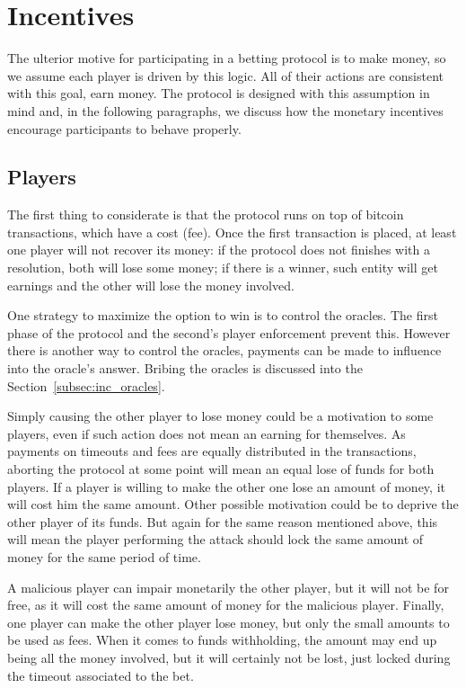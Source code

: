 \section{Incentives}

The ulterior motive for participating in a betting protocol is to make money, so
  we assume each player is driven by this logic.
All of their actions are consistent with this goal, earn money.
The protocol is designed with this assumption in mind and, in the following
  paragraphs, we discuss how the monetary incentives encourage participants to
  behave properly.

\subsection{Players}

The first thing to considerate is that the protocol runs on top of bitcoin
  transactions, which have a cost (fee).
Once the first transaction is placed, at least one player will not recover its
  money: if the protocol does not finishes with a resolution, both will lose
  some money; if there is a winner, such entity will get earnings and the other
  will lose the money involved.

One strategy to maximize the option to win is to control the oracles.
The first phase of the protocol and the second's player enforcement
  prevent this.
However there is another way to control the oracles, payments can be made to
  influence into the oracle's answer.
Bribing the oracles is discussed into the Section~\ref{subsec:inc_oracles}.

Simply causing the other player to lose money could be a motivation to some
  players, even if such action does not mean an earning for themselves.
As payments on timeouts and fees are equally distributed in the transactions,
  aborting the protocol at some point will mean an equal lose of funds for both
  players. If a player is willing to make the other one lose an amount of money,
  it will cost him the same amount.
Other possible motivation could be to deprive the other player of its funds.
But again for the same reason mentioned above, this will mean the player
  performing the attack should lock the same amount of money for the same period
  of time.

A malicious player can impair monetarily the other player, but it will not be
  for free, as it will cost the same amount of money for the malicious player.
Finally, one player can make the other player lose money, but only the small
  amounts to be used as fees.
When it comes to funds withholding, the amount may end up being all the money
  involved, but it will certainly not be lost, just locked during the timeout
  associated to the bet.


